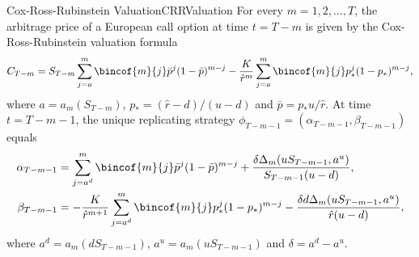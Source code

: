 \begin{prop}{Cox-Ross-Rubinstein Valuation}{CRRValuation}
	For every $m = 1, 2, \dots, T$, the arbitrage price of a European call option at time $t = T - m$ is given by the Cox-Ross-Rubinstein valuation formula
	\begin{equation} \label{eq:CRRValuationFormula}
		C_{T-m} = S_{T-m} \sum_{j=a}^m \bincof{m}{j} \bar{p}^j (1 - \bar{p})^{m-j} - \frac{K}{\hat{r}^m} \sum_{j=a}^m \bincof{m}{j} p_*^j (1 - p_*)^{m-j},
	\end{equation}
	where $a = a_m(S_{T-m})$, $p_* = (\hat{r} - d)/(u-d)$ and $\bar{p} = p_* u / \hat{r}$. At time $t = T - m - 1$, the unique replicating strategy $\phi_{T-m-1} = (\alpha_{T-m-1}, \beta_{T-m-1})$ equals
	\begin{align*}
		\alpha_{T-m-1} & = \sum_{j=a^d}^m \bincof{m}{j} \bar{p}^j (1 - \bar{p})^{m-j} + \frac{\delta \Delta_m(u S_{T-m-1}, a^u)}{S_{T-m-1}(u-d)},                   \\
		\beta_{T-m-1}  & = - \frac{K}{\hat{r}^{m+1}} \sum_{j=a^d}^m \bincof{m}{j} p_*^j (1 - p_*)^{m-j} - \frac{\delta d \Delta_m(u S_{T-m-1}, a^u)}{\hat{r}(u-d)},
	\end{align*}
	where $a^d = a_m(d S_{T-m-1})$, $a^u = a_m(u S_{T-m-1})$ and $\delta = a^d - a^u$.
\end{prop}
